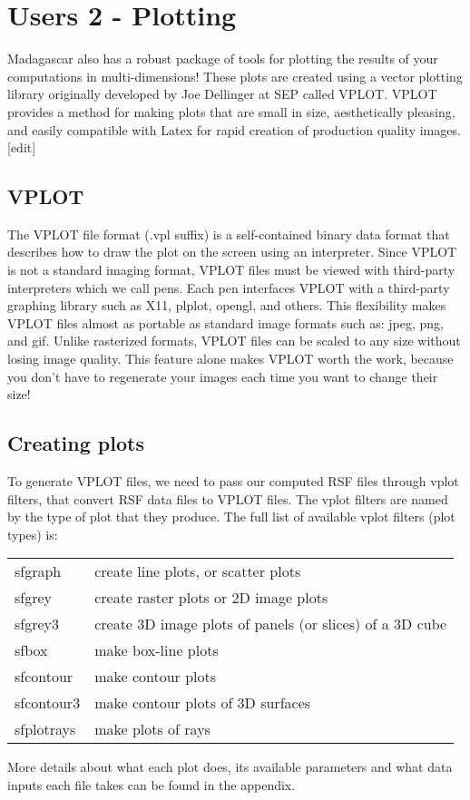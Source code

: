 \section{Users 2 - Plotting}

Madagascar also has a robust package of tools for plotting the results of your computations in multi-dimensions! These plots are created using a vector plotting library originally developed by Joe Dellinger at SEP called VPLOT. VPLOT provides a method for making plots that are small in size, aesthetically pleasing, and easily compatible with Latex for rapid creation of production quality images.
[edit]

\subsection{VPLOT}
The VPLOT file format (.vpl suffix) is a self-contained binary data format that describes how to draw the plot on the screen using an interpreter. Since VPLOT is not a standard imaging format, VPLOT files must be viewed with third-party interpreters which we call pens. Each pen interfaces VPLOT with a third-party graphing library such as X11, plplot, opengl, and others. This flexibility makes VPLOT files almost as portable as standard image formats such as: jpeg, png, and gif. Unlike rasterized formats, VPLOT files can be scaled to any size without losing image quality. This feature alone makes VPLOT worth the work, because you don't have to regenerate your images each time you want to change their size!

\subsection{Creating plots}
To generate VPLOT files, we need to pass our computed RSF files through vplot filters, that convert RSF data files to VPLOT files. The vplot filters are named by the type of plot that they produce. The full list of available vplot filters (plot types) is:
\begin{tabular}{| l | l | }
    \hline
sfgraph & create line plots, or scatter plots \\
sfgrey & create raster plots or 2D image plots \\
sfgrey3 & create 3D image plots of panels (or slices) of a 3D cube \\
sfbox & make box-line plots \\
sfcontour & make contour plots \\
sfcontour3 & make contour plots of 3D surfaces \\
sfplotrays & make plots of rays \\
\hline
\end{tabular}
More details about what each plot does, its available parameters and what data inputs each file takes can be found in the appendix.

